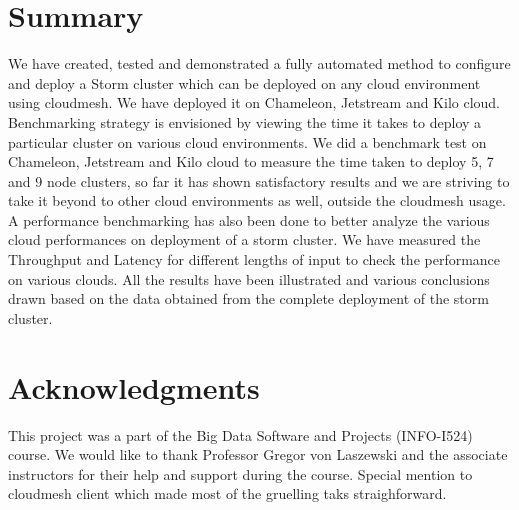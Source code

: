 \documentclass[9pt,twocolumn,twoside]{../../styles/osajnl}
\begin{document}
\section{Summary}
We have created, tested and demonstrated a fully automated method to
configure and deploy a Storm cluster which can be deployed on any
cloud environment using cloudmesh. We have deployed it on
Chameleon, Jetstream and Kilo cloud. Benchmarking strategy is envisioned
by viewing the time it takes to deploy a particular cluster on various
cloud environments. We did a benchmark test on Chameleon, Jetstream
and Kilo cloud to measure the time taken to deploy 5, 7 and 9 node
clusters, so far it has shown satisfactory results and we are striving
to take it beyond to other cloud environments as well, outside the
cloudmesh usage. A performance benchmarking has also been done to
better analyze the various cloud performances on deployment of a storm
cluster. We have measured the Throughput and Latency for different
lengths of input to check the performance on various clouds. All the
results have been illustrated and various conclusions drawn based on
the data obtained from the complete deployment of the storm cluster.

\section{Acknowledgments}
This project was a part of the Big Data Software and Projects
(INFO-I524) course. We would like to thank Professor Gregor von
Laszewski and the associate instructors for their help and support
during the course. Special mention to cloudmesh client which made most
of the gruelling taks straighforward.
\end{document}
